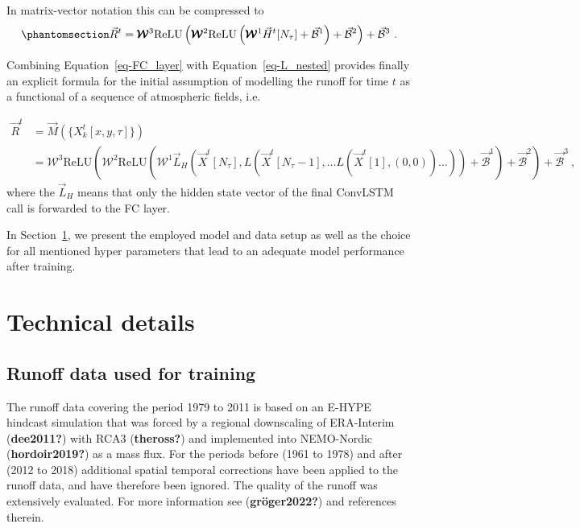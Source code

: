 \documentclass[
]{agujournal2019}
\begin{document}
In matrix-vector notation this can be compressed to
\begin{equation}\phantomsection\label{eq-FC_layer}{
\begin{aligned}
\vec{R}^t = \pmb{\mathcal{W}}^{3}\mathrm{ReLU}\left(\pmb{\mathcal{W}}^{2}\mathrm{ReLU}\left(\pmb{\mathcal{W}}^{1} \vec{H}^t[N_\tau] + \vec{\mathcal{B}}^1\right) + \vec{\mathcal{B}}^2 \right) + \vec{\mathcal{B}}^3 \ .
\end{aligned}
}\end{equation}

Combining Equation~\ref{eq-FC_layer} with Equation~\ref{eq-L_nested}
provides finally an explicit formula for the initial assumption of
modelling the runoff for time \(t\) as a functional of a sequence of
atmospheric fields, i.e.

\[
\begin{aligned}
\vec{R}^t & = \vec{M}(\{X^t_k[x,y,\tau]\}) \\
& = \pmb{\mathcal{W}}^{3}\mathrm{ReLU}\left(\pmb{\mathcal{W}}^{2}\mathrm{ReLU}\left(\pmb{\mathcal{W}}^{1} \vec{L}_H \left( \vec{X}^t[N_\tau], L \left( \vec{X}^t[N_\tau-1], \ldots L \left( \vec{X}^t[1], (0, 0) \right) \ldots \right) \right) + \vec{\mathcal{B}}^1\right) + \vec{\mathcal{B}}^2 \right) + \vec{\mathcal{B}}^3 \ ,
\end{aligned}
\] where the \(\vec{L}_H\) means that only the hidden state vector of
the final ConvLSTM call is forwarded to the FC layer.

In Section~\ref{sec-technical_details}, we present the employed model
and data setup as well as the choice for all mentioned hyper parameters
that lead to an adequate model performance after training.

\section{Technical details}\label{sec-technical_details}

\subsection{Runoff data used for
training}\label{runoff-data-used-for-training}

The runoff data covering the period 1979 to 2011 is based on an E-HYPE
hindcast simulation that was forced by a regional downscaling of
ERA-Interim (\textbf{dee2011?}) with RCA3 (\textbf{theross?}) and
implemented into NEMO-Nordic (\textbf{hordoir2019?}) as a mass flux. For
the periods before (1961 to 1978) and after (2012 to 2018) additional
spatial temporal corrections have been applied to the runoff data, and
have therefore been ignored. The quality of the runoff was extensively
evaluated. For more information see (\textbf{gröger2022?}) and
references therein.
\end{document}
